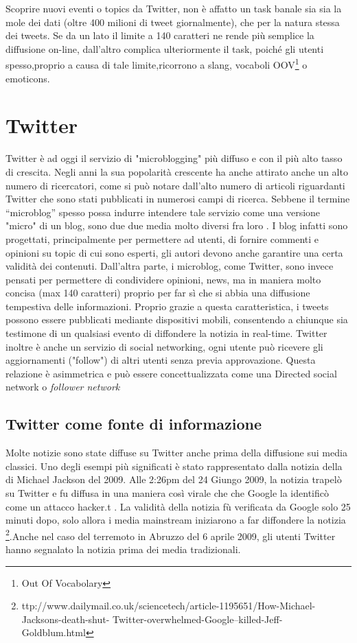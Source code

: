 

Scoprire nuovi eventi o topics da Twitter, non è affatto un task banale sia 
sia la mole dei dati (oltre 400 milioni di tweet giornalmente), che per la natura stessa dei tweets. Se da un lato il limite a 140 caratteri ne rende più semplice la diffusione on-line, dall'altro complica ulteriormente il task, poiché gli utenti spesso,proprio a causa di tale limite,ricorrono a slang, vocaboli OOV\footnote{Out Of Vocabolary} o emoticons.
\section{Twitter}
Twitter è ad oggi il servizio di "microblogging" più diffuso e con il più alto tasso di crescita.  Negli anni la sua popolarità crescente ha anche attirato anche un alto numero di ricercatori, come si può notare dall'alto numero di articoli riguardanti Twitter che sono stati pubblicati in numerosi campi di ricerca.
Sebbene il termine  “microblog” spesso possa indurre intendere tale servizio come una versione "micro" di un blog, sono due due media molto diversi fra loro \cite{export:69500}. I blog infatti sono progettati, principalmente per permettere ad utenti, di fornire commenti e opinioni su topic di cui sono esperti, gli autori devono anche garantire una certa validità dei contenuti. Dall'altra parte, i microblog, come Twitter, sono invece pensati per permettere di condividere opinioni, news, ma in maniera molto concisa (max 140 caratteri) proprio per far sì che si abbia una  diffusione tempestiva delle informazioni. Proprio grazie a questa caratteristica, i tweets possono essere pubblicati mediante dispositivi mobili, consentendo a chiunque sia testimone di un qualsiasi evento di diffondere la notizia in real-time. Twitter inoltre è anche un servizio di social networking, ogni utente può ricevere gli aggiornamenti ("follow")  di altri utenti senza previa approvazione. Questa relazione è asimmetrica e può essere concettualizzata come una Directed social network o \emph{follower network} 
\subsection{Twitter come fonte di informazione}
Molte notizie sono state diffuse su Twitter anche prima della diffusione sui media classici. Uno degli esempi più significati è stato rappresentato dalla notizia della di Michael Jackson del 2009. Alle 2:26pm
del 24 Giungo 2009, la notizia trapelò su Twitter e fu diffusa in una maniera così virale che che Google la identificò come un attacco hacker.t . La validità della notizia fù verificata da Google solo 25 minuti dopo,   solo allora i media mainstream iniziarono a far diffondere la notizia \footnote{ttp://www.dailymail.co.uk/sciencetech/article-1195651/How-Michael-Jacksons-death-shut-
Twitter-overwhelmed-Google–killed-Jeff-Goldblum.html}.Anche nel caso del terremoto in Abruzzo del 6 aprile 2009, gli utenti Twitter hanno segnalato la notizia prima dei media tradizionali. 

